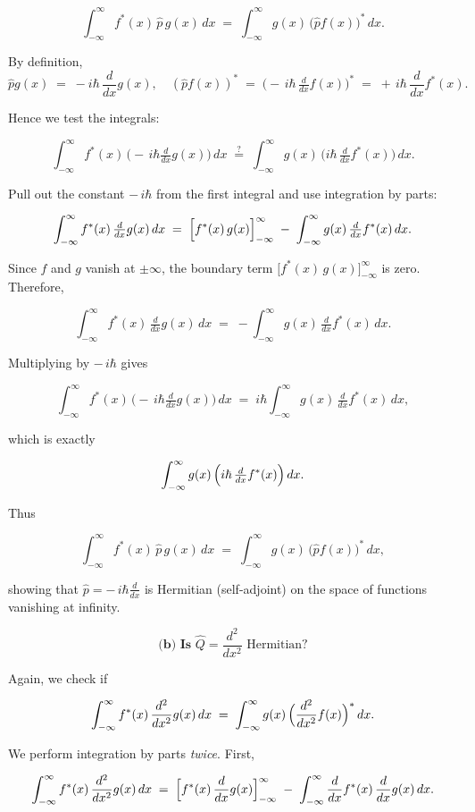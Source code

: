 \documentclass{article}
\begin{document}
\[
\int_{-\infty}^\infty f^*(x)\,\hat{p}\,g(x)\,dx 
\;=\;
\int_{-\infty}^\infty g(x)\,\bigl(\hat{p}f(x)\bigr)^*\,dx.
\]

By definition, 
\[
\hat{p}g(x) \;=\; -i\hbar \,\frac{d}{dx}g(x),
\quad
(\hat{p}f(x))^* 
\;=\; \bigl(-\,i\hbar\,\tfrac{d}{dx}f(x)\bigr)^*
\;=\; +\,i\hbar\,\frac{d}{dx}f^*(x).
\]

Hence we test the integrals:

\[
\int_{-\infty}^\infty f^*(x)\,\bigl(-\,i\hbar \tfrac{d}{dx}g(x)\bigr)\,dx
\;\stackrel{?}{=}\;
\int_{-\infty}^\infty g(x)\,\bigl(i\hbar\,\tfrac{d}{dx}f^*(x)\bigr)\,dx.
\]

Pull out the constant \(-\,i\hbar\) from the first integral and use integration by parts:

\[
\int_{-\infty}^\infty f^*(x)\,\tfrac{d}{dx}g(x)\,dx 
\;=\;
\Bigl[f^*(x)\,g(x)\Bigr]_{-\infty}^\infty
\;-\;\int_{-\infty}^\infty g(x)\,\tfrac{d}{dx}f^*(x)\,dx.
\]

Since \(f\) and \(g\) vanish at \(\pm\infty\), the boundary term \(\bigl[f^*(x)\,g(x)\bigr]_{-\infty}^\infty\) is zero. Therefore,

\[
\int_{-\infty}^\infty f^*(x)\,\tfrac{d}{dx}g(x)\,dx
\;=\;
-\int_{-\infty}^\infty g(x)\,\tfrac{d}{dx}f^*(x)\,dx.
\]

Multiplying by \(-\,i\hbar\) gives

\[
\int_{-\infty}^\infty f^*(x)\,\bigl(-\,i\hbar \tfrac{d}{dx}g(x)\bigr)\,dx
\;=\;
i\hbar \int_{-\infty}^\infty g(x)\,\tfrac{d}{dx}f^*(x)\,dx,
\]

which is exactly

\[
\int_{-\infty}^\infty g(x)\,\Bigl(i\hbar\,\tfrac{d}{dx}f^*(x)\Bigr)\,dx.
\]

Thus

\[
\int_{-\infty}^\infty f^*(x)\,\hat{p}\,g(x)\,dx 
\;=\;
\int_{-\infty}^\infty g(x)\,\bigl(\hat{p}f(x)\bigr)^*\,dx,
\]

showing that \(\hat{p} = -\,i\hbar \tfrac{d}{dx}\) is Hermitian (self-adjoint) on the space of functions vanishing at infinity.

\[
\textbf{(b) Is } \hat{Q} = \frac{d^2}{dx^2} \text{ Hermitian?}
\]

Again, we check if

\[
\int_{-\infty}^\infty f^*(x)\,\frac{d^2}{dx^2}g(x)\,dx
\;=\;
\int_{-\infty}^\infty g(x)\,\Bigl(\frac{d^2}{dx^2}f(x)\Bigr)^*\,dx.
\]

We perform integration by parts \emph{twice}. First,

\[
\int_{-\infty}^\infty f^*(x)\,\frac{d^2}{dx^2}g(x)\,dx
\;=\;
\Bigl[f^*(x)\,\frac{d}{dx}g(x)\Bigr]_{-\infty}^\infty
\;-\;
\int_{-\infty}^\infty \frac{d}{dx}f^*(x)\,\frac{d}{dx}g(x)\,dx.
\]
\end{document}
